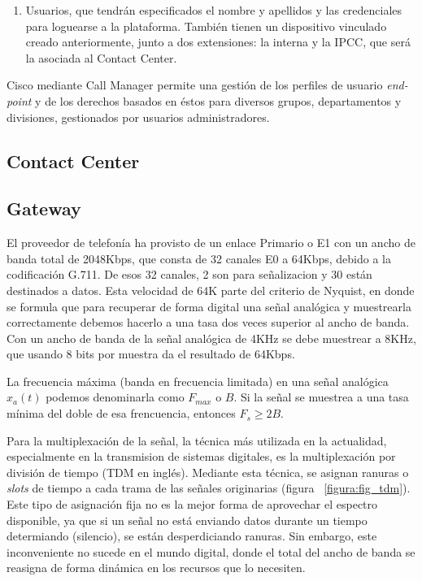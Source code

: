 \documentclass[a4paper, 12pt]{book}
\begin{document}
\begin{enumerate}
  \item Usuarios, que tendrán especificados el nombre y apellidos y las credenciales para loguearse a la plataforma. También tienen un dispositivo vinculado creado anteriormente, junto a dos extensiones: la interna y la IPCC, que será la asociada al Contact Center.
\end{enumerate}

Cisco mediante Call Manager permite una gestión de los perfiles de usuario \emph{end-point} y de los derechos basados en éstos para diversos grupos, departamentos y divisiones, gestionados por usuarios administradores.

\subsection{Contact Center}
\label{sec:contact_center}



\subsection{Gateway}
\label{sec:gateway}

El proveedor de telefonía ha provisto de un enlace Primario o E1 con un ancho de banda total de 2048Kbps, que consta de 32 canales E0 a 64Kbps, debido a la codificación G.711. De esos 32 canales, 2 son para señalizacion y 30 están destinados a datos. 
Esta velocidad de 64K parte del criterio de Nyquist, en donde se formula que para recuperar de forma digital una señal analógica y muestrearla correctamente debemos hacerlo a una tasa dos veces superior al ancho de banda. 
Con un ancho de banda de la señal analógica de 4KHz se debe muestrear a 8KHz, que usando 8 bits por muestra da el resultado de 64Kbps.

La frecuencia máxima (banda en frecuencia limitada) en una señal analógica $x_{a}(t)$ podemos denominarla como $F_{max}$  o $B$. Si la señal se muestrea a una tasa mínima del doble de esa frencuencia, entonces $F_{s} \geq 2B$.

Para la multiplexación de la señal, la técnica más utilizada en la actualidad, especialmente en la transmision de sistemas digitales, es la multiplexación por división de tiempo (TDM en inglés). Mediante esta técnica, se asignan ranuras o \emph{slots} de tiempo a cada trama de las señales originarias (figura ~\ref{figura:fig_tdm}). Este tipo de asignación fija no es la mejor forma de aprovechar el espectro disponible, ya que si un señal no está enviando datos durante un tiempo determiando (silencio), se están desperdiciando ranuras. Sin embargo, este inconveniente no sucede en el mundo digital, donde el total del ancho de banda se reasigna de forma dinámica en los recursos que lo necesiten.
\end{document}
